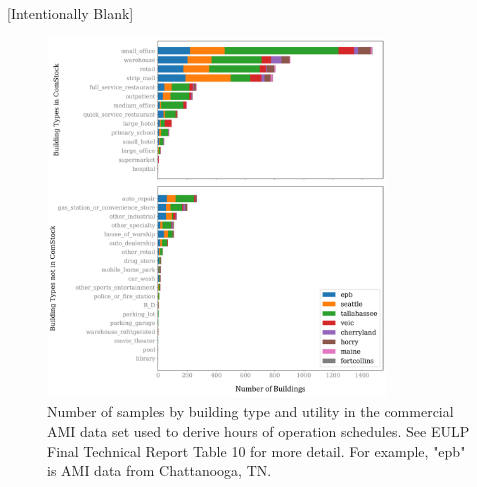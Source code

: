 \label{appendix:B_figures}
[Intentionally Blank]
\begin{figure}
    \centering \includegraphics[width=0.8\textwidth]{figures/utility_building_type.png}
    \caption[Number of samples by building type and utility in the commercial AMI data set]{Number of samples by building type and utility in the commercial AMI data set used to derive hours of operation schedules. See EULP Final Technical Report Table 10 for more detail. For example, "epb" is AMI data from Chattanooga, TN.}
    \label{fig:utility_building_type}
\end{figure}

